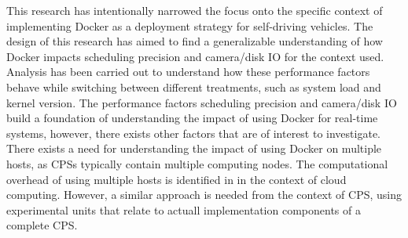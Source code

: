 This research has intentionally narrowed the focus onto the specific context of implementing Docker as a deployment strategy for self-driving vehicles. The design of this research has aimed to find a generalizable understanding of how Docker impacts scheduling precision and camera/disk IO for the context used. Analysis has been carried out to understand how these performance factors behave while switching between different treatments, such as system load and kernel version. The performance factors scheduling precision and camera/disk IO build a foundation of understanding the impact of using Docker for real-time systems, however, there exists other factors that are of interest to investigate. There exists a need for understanding the impact of using Docker on multiple hosts, as CPSs typically contain multiple computing nodes. The computational overhead of using multiple hosts is identified in \cite{p1} in the context of cloud computing. However, a similar approach is needed from the context of CPS, using experimental units that relate to actuall implementation components of a complete CPS.






















